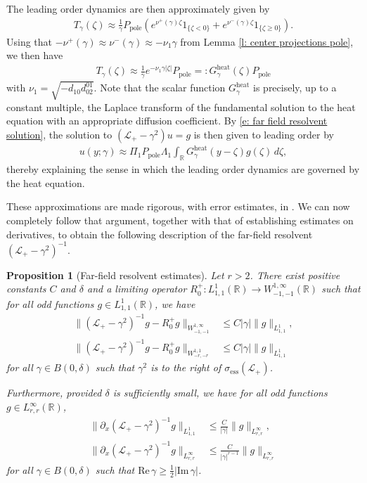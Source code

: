 \documentclass[11pt]{article}
\newcommand{\R}{\mathbb{R}}
\newcommand{\mcl}{\mathcal{L}}
\renewcommand{\Re}{\mathrm{Re} \,}
\renewcommand{\Im}{\mathrm{Im} \,}
\newtheorem{prop}{Proposition}
\numberwithin{equation}{section}
\numberwithin{prop}{section}
\begin{document}
The leading order dynamics are then approximately given by
\begin{align*}
T_\gamma(\zeta) \approx \frac{1}{\gamma} P_\mathrm{pole} \left( e^{\nu^+(\gamma) \zeta} 1_{\{\zeta < 0\}} + e^{\nu^-(\gamma) \zeta} 1_{\{\zeta \geq 0\}} \right). 
\end{align*} 
Using that $-\nu^+(\gamma) \approx  \nu^-(\gamma) \approx - \nu_1 \gamma$ from Lemma \ref{l: center projections pole}, we then have
\begin{align*}
	T_\gamma(\zeta) \approx \frac{1}{\gamma}  e^{-\nu_1 \gamma |\zeta|} P_\mathrm{pole} =: G^\mathrm{heat}_\gamma(\zeta) P_\mathrm{pole}
\end{align*}
with $\nu_1 = \sqrt{-d_{10}d_{02}^{01}}$. Note that the scalar function $G^\mathrm{heat}_\gamma$ is precisely, up to a constant multiple, the Laplace transform of the fundamental solution to the heat equation with an appropriate diffusion coefficient. By \eqref{e: far field resolvent solution}, the solution to $(\mcl_+ - \gamma^2) u = g$ is then given to leading order by
\begin{align*}
	u(y;\gamma) \approx \Pi_1 P_\mathrm{pole} \Lambda_1 \int_\R G^\mathrm{heat}_\gamma (y-\zeta) g(\zeta) \, d \zeta,
\end{align*}
thereby explaining the sense in which the leading order dynamics are governed by the heat equation.

These approximations are made rigorous, with error estimates, in \cite[Section 2]{SIMA}. We can now completely follow that argument, together with that of \cite[Proposition 3.2]{CAMS} establishing estimates on derivatives, to obtain the following description of the far-field resolvent $(\mcl_+ - \gamma^2)^{-1}$. 

\begin{prop}[Far-field resolvent estimates]\label{p: far field resolvent expansion}
	Let $r > 2$. There exist positive constants $C$ and $\delta$ and a limiting operator $R_0^+ : L^1_{1,1} (\R) \to W^{1,\infty}_{-1, -1} (\R)$ such that for all odd functions $g \in L^1_{1,1}(\R)$, we have
	\begin{align}
	\| (\mcl_+ - \gamma^2)^{-1} g - R_0^+ g \|_{W^{1,\infty}_{-1,-1}} &\leq C |\gamma| \| g \|_{L^1_{1,1}}, \\
	\| (\mcl_+ - \gamma^2)^{-1} g - R_0^+ g \|_{W^{1,1}_{-r, -r}} & \leq C |\gamma| \|g\|_{L^1_{1,1}}
	\end{align}
	for all $\gamma \in B(0,\delta)$ such that $\gamma^2$ is to the right of $\sigma_\mathrm{ess}(\mcl_+)$. 
	
	Furthermore, provided $\delta$ is sufficiently small, we have for all odd functions $g \in L^\infty_{r,r} (\R)$,
	\begin{align}
		\| \partial_x (\mcl_+-\gamma^2)^{-1} g \|_{L^1_{1,1}} &\leq \frac{C}{|\gamma|} \| g \|_{L^\infty_{r,r}}, \\
		\| \partial_x (\mcl_+ - \gamma^2)^{-1} g \|_{L^\infty_{r,r}} &\leq \frac{C}{|\gamma|^{r-1}} \| g \|_{L^\infty_{r,r}}
	\end{align}
	for all $\gamma \in B(0,\delta)$ such that $\Re \gamma \geq \frac{1}{2} | \Im \gamma|$. 
\end{prop}
\end{document}
